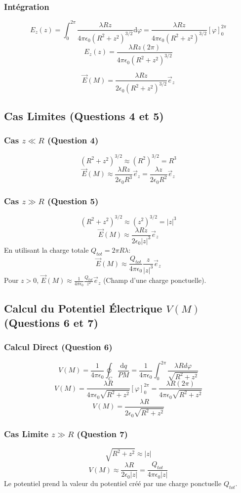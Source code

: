 \documentclass[french]{yLectureNote}
\renewcommand{\vec}{\overrightarrow}
\newcommand{\dd}{\mathrm{d}}
\begin{document}
\subsubsection{Intégration}
$$E_z(z) = \int_0^{2\pi} \frac{\lambda R z}{4\pi\epsilon_0 (R^2 + z^2)^{3/2}} \dd \varphi = \frac{\lambda R z}{4\pi\epsilon_0 (R^2 + z^2)^{3/2}} [ \varphi ]_0^{2\pi}$$
$$E_z(z) = \frac{\lambda R z (2\pi)}{4\pi\epsilon_0 (R^2 + z^2)^{3/2}}$$

$$\vec{E}(M) = \frac{\lambda R z}{2\epsilon_0 (R^2 + z^2)^{3/2}} \vec{e}_z$$

\subsection{Cas Limites (Questions 4 et 5)}

\subsubsection{Cas $z \ll R$ (Question 4)}
$$(R^2 + z^2)^{3/2} \approx (R^2)^{3/2} = R^3$$
$$\vec{E}(M) \approx \frac{\lambda R z}{2\epsilon_0 R^3} \vec{e}_z = \frac{\lambda z}{2\epsilon_0 R^2} \vec{e}_z$$

\subsubsection{Cas $z \gg R$ (Question 5)}
$$(R^2 + z^2)^{3/2} \approx (z^2)^{3/2} = |z|^3$$
$$\vec{E}(M) \approx \frac{\lambda R z}{2\epsilon_0 |z|^3} \vec{e}_z$$
En utilisant la charge totale $Q_{tot} = 2\pi R \lambda$:
$$\vec{E}(M) \approx \frac{Q_{tot}}{4\pi\epsilon_0} \frac{z}{|z|^3} \vec{e}_z$$
Pour $z > 0$, $\vec{E}(M) \approx \frac{1}{4\pi\epsilon_0} \frac{Q_{tot}}{z^2} \vec{e}_z$ (Champ d'une charge ponctuelle).

\subsection{Calcul du Potentiel Électrique $V(M)$ (Questions 6 et 7)}

\subsubsection{Calcul Direct (Question 6)}
$$V(M) = \frac{1}{4\pi\epsilon_0} \oint_C \frac{\dd q}{PM} = \frac{1}{4\pi\epsilon_0} \int_0^{2\pi} \frac{\lambda R d\varphi}{\sqrt{R^2 + z^2}}$$
$$V(M) = \frac{\lambda R}{4\pi\epsilon_0 \sqrt{R^2 + z^2}} [ \varphi ]_0^{2\pi} = \frac{\lambda R (2\pi)}{4\pi\epsilon_0 \sqrt{R^2 + z^2}}$$
$$V(M) = \frac{\lambda R}{2\epsilon_0 \sqrt{R^2 + z^2}}$$

\subsubsection{Cas Limite $z \gg R$ (Question 7)}
$$\sqrt{R^2 + z^2} \approx |z|$$
$$V(M) \approx \frac{\lambda R}{2\epsilon_0 |z|} = \frac{Q_{tot}}{4\pi\epsilon_0 |z|}$$
Le potentiel prend la valeur du potentiel créé par une charge ponctuelle $Q_{tot}$.
 
\end{document}
